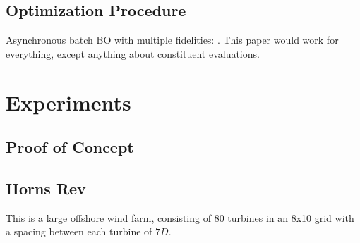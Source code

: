 \documentclass[12pt]{article}
\begin{document}
\subsection{Optimization Procedure}

Asynchronous batch BO with multiple fidelities: \cite{folchCombiningMultiFidelityModelling2023}.
This paper would work for everything, except anything about constituent evaluations.

\section{Experiments}

\subsection{Proof of Concept}

\subsection{Horns Rev}

This is a large offshore wind farm, consisting of 80 turbines in an 8x10 grid with a spacing
between each turbine of $7D$.
\end{document}
